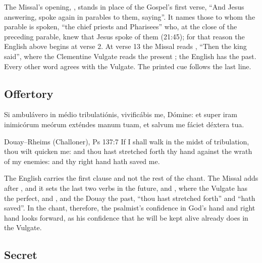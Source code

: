 \noindent The Missal's opening, , stands in place of
the Gospel's first verse, ``And Jesus answering, spoke again in parables to
them, saying''. It names those to whom the parable is spoken, ``the chief
priests and Pharisees'' who, at the close of the preceding parable, knew that
Jesus spoke of them (21:45); for that reason the English above begins at
verse 2. At verse 13
the Missal reads , ``Then the king said'', where the
Clementine Vulgate reads the present ; the English has the past.
Every other word agrees with the Vulgate. The printed cue 
follows the last line.

\subsection{Offertory}
\label{proper-offertory}


\begin{latinproper}
Si ambulávero in médio tribulatiónis, vivificábis me, Dómine: et super iram
inimicórum meórum exténdes manum tuam, et salvum me fáciet déxtera tua.
\end{latinproper}

\begin{englishwitness}{Douay--Rheims (Challoner), Ps 137:7}
If I shall walk in the midst of tribulation, thou wilt quicken me: and thou
hast stretched forth thy hand against the wrath of my enemies: and thy right
hand hath saved me.
\end{englishwitness}

\noindent The English carries the first clause and not the rest of the chant.
The Missal adds  after , and it sets the
last two verbs in the future,  and , where the
Vulgate has the perfect,  and , and the Douay
the past, ``thou hast stretched forth'' and ``hath saved''. In the chant,
therefore, the psalmist's confidence in God's hand and right hand looks
forward, as his confidence that he will be kept alive already does in the
Vulgate.

\subsection{Secret}
\label{proper-secret}

